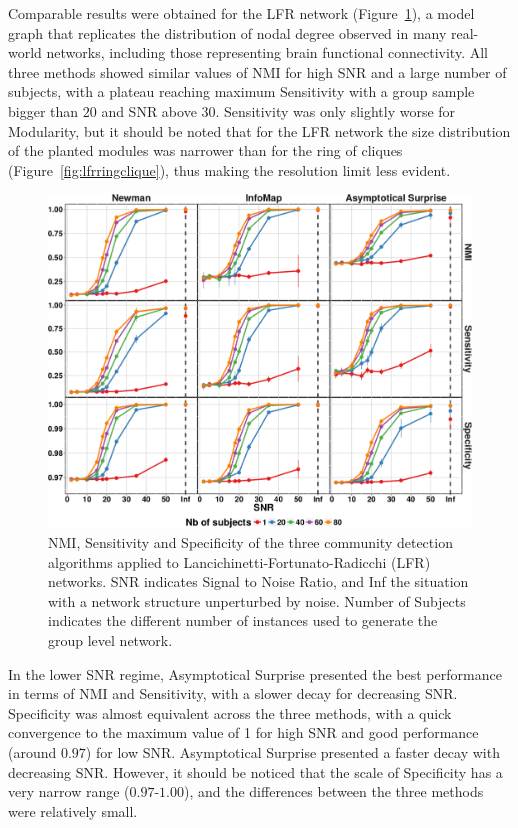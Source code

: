 Comparable results were obtained for the LFR network (Figure~\ref{fig:nmisensitivityspecificitylfr}), a model graph that replicates the distribution of nodal degree observed in many real-world networks, including those representing brain functional connectivity.
All three methods showed similar values of NMI for high SNR and a large number of subjects, with a plateau reaching maximum Sensitivity with a group sample bigger than $20$ and SNR above $30$.
Sensitivity was only slightly worse for Modularity, but it should be noted that for the LFR network the size distribution of the planted modules was narrower than for the ring of cliques (Figure~\ref{fig:lfrringclique}), thus making the resolution limit less evident.
\begin{figure}[htb!]
\includegraphics[width=\textwidth]{images/pacopaperfigure5.pdf}
\caption{NMI, Sensitivity and Specificity of the three community detection algorithms applied to Lancichinetti-Fortunato-Radicchi (LFR) networks. SNR indicates Signal to Noise Ratio, and Inf the situation with a network structure unperturbed by noise. Number of Subjects indicates the different number of instances used to generate the group level network.}
\label{fig:nmisensitivityspecificitylfr}
\end{figure}
In the lower SNR regime, Asymptotical Surprise presented the best performance in terms of NMI and Sensitivity, with a slower decay for decreasing SNR. 
Specificity was almost equivalent across the three methods, with a quick convergence to the maximum value of 1 for high SNR and good performance (around $0.97$) for low SNR.
Asymptotical Surprise presented a faster decay with decreasing SNR.
However, it should be noticed that the scale of Specificity has a very narrow range ($0.97$-$1.00$), and the differences between the three methods were relatively small.

